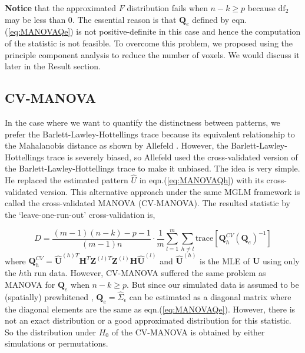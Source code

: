\textbf{Notice} that the approximated $F$ distribution fails when
$n-k\ge p$ because $\text{df}_{2}$ may be less than $0$. The essential
reason is that $\boldsymbol{Q}_{e}$ defined by eqn.(\ref{eq:MANOVAQe})
is not positive-definite in this case and hence the computation of
the statistic is not feasible. To overcome this problem, we proposed
using the principle component analysis to reduce the number of voxels.
We would discuss it later in the Result section. 


\subsection{CV-MANOVA}

In the case where we want to quantify the distinctness between patterns,
we prefer the Barlett-Lawley-Hottellings trace because its equivalent
relationship to the Mahalanobis distance as shown by Allefeld \cite{allefeld2014searchlight}.
However, the Barlett-Lawley-Hottellings trace is severely biased,
so Allefeld used the cross-validated version of the Barlett-Lawley-Hottellings
trace to make it unbiased. The idea is very simple. He replaced the
estimated pattern $\hat{U}$ in eqn.(\ref{eq:MANOVAQh}) with its
cross-validated version. This alternative approach under the same
MGLM framework is called the cross-validated MANOVA (CV-MANOVA). The
resulted statistic by the \textquoteleft leave-one-run-out\textquoteright{}
cross-validation is,

\begin{equation}
D=\frac{(m-1)\left(n-k\right)-p-1}{(m-1)n}\cdot\frac{1}{m}\sum_{l=1}^{m}\sum_{h\neq l}\text{trace}\left[\boldsymbol{Q}_{h}^{CV}\left(\boldsymbol{Q}_{e}\right)^{-1}\right]\label{eq:CVMANOVA}
\end{equation}
where $\boldsymbol{Q}_{h}^{CV}=\hat{\boldsymbol{U}}^{(h)T}\boldsymbol{H}^{T}\boldsymbol{Z}^{(l)T}\boldsymbol{Z}^{(l)}\boldsymbol{H}\hat{\boldsymbol{U}}^{(l)}$
and $\hat{\boldsymbol{U}}^{(h)}$ is the MLE of $\boldsymbol{\boldsymbol{U}}$
using only the $h$th run data. However, CV-MANOVA suffered the same
problem as MANOVA for $\boldsymbol{Q}_{e}$ when $n-k\ge p$. But
since our simulated data is assumed to be (spatially) prewhitened
, $\boldsymbol{Q}_{e}=\hat{\Sigma}_{\epsilon}$ can be estimated as
a diagonal matrix where the diagonal elements are the same as eqn.(\ref{eq:MANOVAQe}).
However, there is not an exact distribution or a good approximated
distribution for this statistic. So the distribution under $H_{0}$
of the CV-MANOVA is obtained by either simulations or permutations. 


